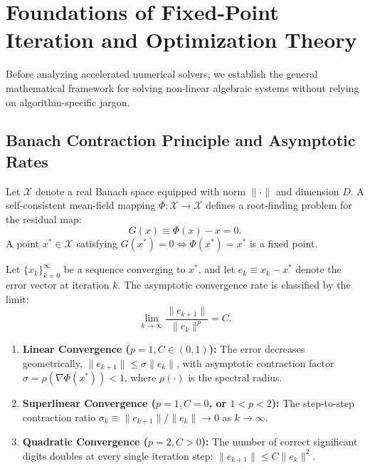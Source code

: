 \section{Foundations of Fixed-Point Iteration and Optimization Theory}
\label{sec:m1_6_foundations_fixed_point}

Before analyzing accelerated numerical solvers, we establish the general mathematical framework for solving non-linear algebraic systems without relying on algorithm-specific jargon.

\subsection{Banach Contraction Principle and Asymptotic Rates}
Let $\mathcal{X}$ denote a real Banach space equipped with norm $\|\cdot\|$ and dimension $D$. A self-consistent mean-field mapping $\Phi: \mathcal{X} \to \mathcal{X}$ defines a root-finding problem for the residual map:
\begin{equation}
G(x) \equiv \Phi(x) - x = 0.
\end{equation}
A point $x^* \in \mathcal{X}$ satisfying $G(x^*) = 0 \iff \Phi(x^*) = x^*$ is a fixed point.

\begin{definition}
Let $\{x_k\}_{k=0}^\infty$ be a sequence converging to $x^*$, and let $e_k \equiv x_k - x^*$ denote the error vector at iteration $k$. The asymptotic convergence rate is classified by the limit:
\begin{equation}
\lim_{k \to \infty} \frac{\|e_{k+1}\|}{\|e_k\|^p} = C.
\end{equation}
\begin{enumerate}
\item \textbf{Linear Convergence ($p=1, C \in (0, 1)$):} The error decreases geometrically, $\|e_{k+1}\| \le \sigma \|e_k\|$, with asymptotic contraction factor $\sigma = \rho(\nabla \Phi(x^*)) < 1$, where $\rho(\cdot)$ is the spectral radius.
\item \textbf{Superlinear Convergence ($p=1, C=0$, or $1 < p < 2$):} The step-to-step contraction ratio $\sigma_k \equiv \|e_{k+1}\| / \|e_k\| \to 0$ as $k \to \infty$.
\item \textbf{Quadratic Convergence ($p=2, C > 0$):} The number of correct significant digits doubles at every single iteration step: $\|e_{k+1}\| \le C \|e_k\|^2$.
\end{enumerate}
\end{definition}

